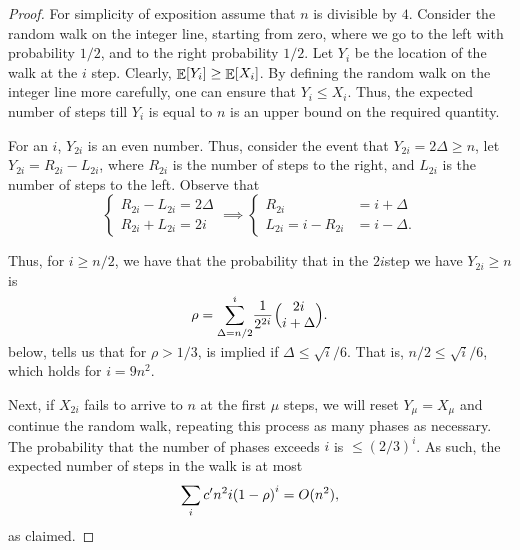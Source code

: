 \begin{proof}
    For simplicity of exposition assume that $n$ is divisible by $4$.
    Consider the random walk on the integer line, starting from zero,
    where we go to the left with probability $1/2$, and to the right
    probability $1/2$. Let $Y_i$ be the location of the walk at the
    $i$ step. Clearly, $\mathop{\mathbb{E}}\!\left[ {Y_i} \right] \geq \mathop{\mathbb{E}}\!\left[ {X_i} \right]$. By defining the
    random walk on the integer line more carefully, one can ensure
    that $Y_i \leq X_i$. Thus, the expected number of steps till $Y_i$
    is equal to $n$ is an upper bound on the required quantity.

     
    For an $i$, $Y_{2i}$ is an even number. Thus, consider the event
    that $Y_{2i} = 2\Delta \geq n$, let $Y_{2i} = R_{2i}-L_{2i}$,
    where $R_{2i}$ is the number of steps to the right, and $L_{2i}$
    is the number of steps to the left. Observe that
    \begin{equation*}
        \begin{cases}
          R_{2i} - L_{2i} = 2\Delta\\
          R_{2i} + L_{2i} = 2i
        \end{cases}
        \implies
        \begin{cases}
          R_{2i} &= i +\Delta\\
          L_{2i} = i - R_{2i} &= i - \Delta. 
        \end{cases}        
    \end{equation*}


    

    Thus, for $i \geq n/2$, we have that the
    probability that in the $2i$\th step we have $Y_{2i} \geq n$ is
    \begin{equation*}
        \rho=\smash{\sum_{\Delta=n/2}^{i}}
        \frac{1}{2^{2i}}\ts\mybinom{2i}{i + \Delta}.
    \end{equation*}
     below, tells us that for
    $\rho > 1/3$, is implied if $\Delta \leq \sqrt{i}/6$.  That is,
    $n/2 \leq \sqrt{i}/6$, which holds for $i=9n^2$.
    
    Next, if $X_{2i}$ fails to arrive to $n$ at the first $\mu$ steps,
    we will reset $Y_\mu = X_\mu$ and continue the random walk,
    repeating this process as many phases as necessary. The
    probability that the number of phases exceeds $i$ is
    $\leq (2/3)^i$. As such, the expected number of steps in the walk
    is at most
    \begin{equation*}
        \sum_i c' n^2 i \pth[]{1 - \rho}^i = O(n^2),
    \end{equation*}
    as claimed.
\end{proof}


